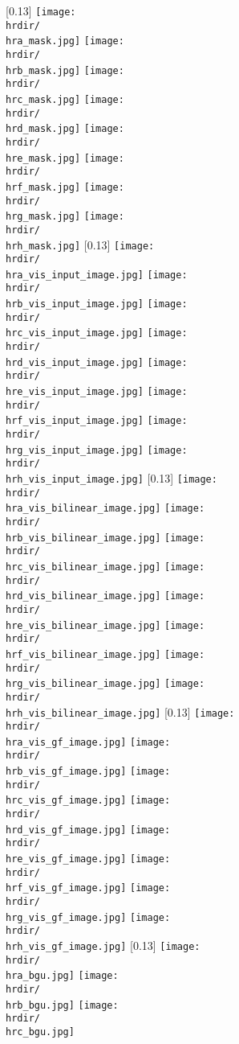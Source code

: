\documentclass[runningheads]{llncs}
\begin{document}
\begin{figure*}[hthb]
\centering
{}[0.13\linewidth]
{
\texttt{[image: \\hrdir/\\hra\_mask.jpg]}
\texttt{[image: \\hrdir/\\hrb\_mask.jpg]}
\texttt{[image: \\hrdir/\\hrc\_mask.jpg]}
\texttt{[image: \\hrdir/\\hrd\_mask.jpg]}
\texttt{[image: \\hrdir/\\hre\_mask.jpg]}
\texttt{[image: \\hrdir/\\hrf\_mask.jpg]}
\texttt{[image: \\hrdir/\\hrg\_mask.jpg]}
\texttt{[image: \\hrdir/\\hrh\_mask.jpg]}
}
[0.13\linewidth]
{
\texttt{[image: \\hrdir/\\hra\_vis\_input\_image.jpg]}
\texttt{[image: \\hrdir/\\hrb\_vis\_input\_image.jpg]}
\texttt{[image: \\hrdir/\\hrc\_vis\_input\_image.jpg]}
\texttt{[image: \\hrdir/\\hrd\_vis\_input\_image.jpg]}
\texttt{[image: \\hrdir/\\hre\_vis\_input\_image.jpg]}
\texttt{[image: \\hrdir/\\hrf\_vis\_input\_image.jpg]}
\texttt{[image: \\hrdir/\\hrg\_vis\_input\_image.jpg]}
\texttt{[image: \\hrdir/\\hrh\_vis\_input\_image.jpg]}
}
[0.13\linewidth]
{
\texttt{[image: \\hrdir/\\hra\_vis\_bilinear\_image.jpg]}
\texttt{[image: \\hrdir/\\hrb\_vis\_bilinear\_image.jpg]}
\texttt{[image: \\hrdir/\\hrc\_vis\_bilinear\_image.jpg]}
\texttt{[image: \\hrdir/\\hrd\_vis\_bilinear\_image.jpg]}
\texttt{[image: \\hrdir/\\hre\_vis\_bilinear\_image.jpg]}
\texttt{[image: \\hrdir/\\hrf\_vis\_bilinear\_image.jpg]}
\texttt{[image: \\hrdir/\\hrg\_vis\_bilinear\_image.jpg]}
\texttt{[image: \\hrdir/\\hrh\_vis\_bilinear\_image.jpg]}
}
[0.13\linewidth]
{
\texttt{[image: \\hrdir/\\hra\_vis\_gf\_image.jpg]}
\texttt{[image: \\hrdir/\\hrb\_vis\_gf\_image.jpg]}
\texttt{[image: \\hrdir/\\hrc\_vis\_gf\_image.jpg]}
\texttt{[image: \\hrdir/\\hrd\_vis\_gf\_image.jpg]}
\texttt{[image: \\hrdir/\\hre\_vis\_gf\_image.jpg]}
\texttt{[image: \\hrdir/\\hrf\_vis\_gf\_image.jpg]}
\texttt{[image: \\hrdir/\\hrg\_vis\_gf\_image.jpg]}
\texttt{[image: \\hrdir/\\hrh\_vis\_gf\_image.jpg]}
}
[0.13\linewidth]
{
\texttt{[image: \\hrdir/\\hra\_bgu.jpg]}
\texttt{[image: \\hrdir/\\hrb\_bgu.jpg]}
\texttt{[image: \\hrdir/\\hrc\_bgu.jpg]}
}
\end{figure*}
\end{document}
